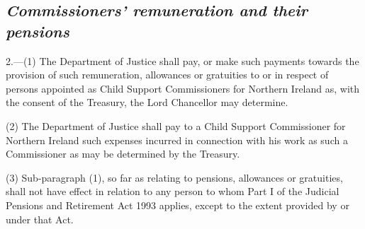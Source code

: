 \documentclass[12pt,a4paper]{article}
\begin{document}
\subsection*{\itshape Commissioners' remuneration and their pensions}

2.---(1) The 
Department of Justice shall  %
pay, or make such payments towards the provision of such remuneration, 
allowances or gratuities to or in respect of persons appointed as Child Support Commissioners 
for Northern Ireland  %
as, with the consent of the Treasury, 
the Lord Chancellor  %
may determine.

(2) The 
Department of Justice  %
shall pay to a Child Support Commissioner 
for Northern Ireland  %
such expenses incurred in connection with his work as such a Commissioner as may be determined by the Treasury.

(3) Sub-paragraph (1), so far as relating to pensions, allowances or gratuities, shall not have effect in relation to any person to whom Part I of the Judicial Pensions and Retirement Act 1993 applies, except to the extent provided by or under that Act.

\end{document}
